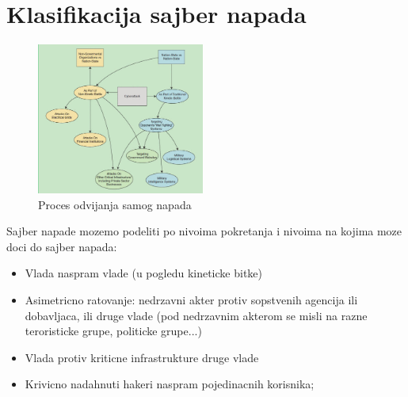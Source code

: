 \documentclass[a4paper]{article}
\begin{document}
{\section{Klasifikacija sajber napada}
\label{sec:naslovN}

\begin{figure}[h!]
  \centering
  \begin{center}
  \includegraphics[width=55mm]{proces.jpg}
  \end{center}
  \caption{Proces odvijanja samog napada}
  \label{fig:vr1}
\end{figure}

Sajber napade mozemo podeliti po nivoima pokretanja i nivoima na kojima moze doci do sajber napada:
\begin{itemize}
    \item Vlada naspram vlade (u pogledu kineticke bitke)
    \item Asimetricno ratovanje: nedrzavni akter protiv sopstvenih agencija ili dobavljaca, ili druge vlade (pod nedrzavnim akterom se misli na razne teroristicke grupe, politicke grupe...)
    \item Vlada protiv kriticne infrastrukture druge vlade
    \item  Krivicno nadahnuti hakeri naspram pojedinacnih korisnika;
\end{itemize}

}
\end{document}

